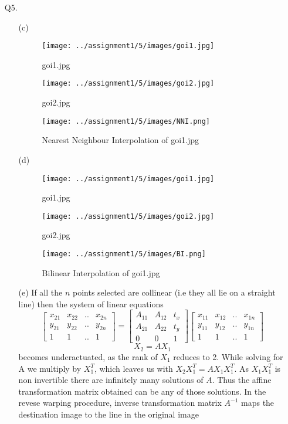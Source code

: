 \documentclass[11pt]{article}
\begin{document}
\maketitle

\begin{enumerate}
\item[Q5.]
\begin{enumerate}

\item[(c)] \
\begin{figure}[!htb]
      \texttt{[image: ../assignment1/5/images/goi1.jpg]}
      \caption*{goi1.jpg}
    \endminipage\hfill
      \texttt{[image: ../assignment1/5/images/goi2.jpg]}
      \caption*{goi2.jpg}
    \endminipage\hfill
      \texttt{[image: ../assignment1/5/images/NNI.png]}
      \caption*{Nearest Neighbour Interpolation of goi1.jpg}
    \endminipage
\end{figure}

\item[(d)] \
\begin{figure}[!htb]
      \texttt{[image: ../assignment1/5/images/goi1.jpg]}
      \caption*{goi1.jpg}
    \endminipage\hfill
      \texttt{[image: ../assignment1/5/images/goi2.jpg]}
      \caption*{goi2.jpg}
    \endminipage\hfill
      \texttt{[image: ../assignment1/5/images/BI.png]}
      \caption*{Bilinear Interpolation of goi1.jpg}
    \endminipage
\end{figure}

\item[(e)] If all the $n$ points selected are collinear (i.e they all lie on a straight line) then the system of linear equations
$$
\begin{bmatrix}
    x_{21} & x_{22} &.. & x_{2n} \\
    y_{21} & y_{22} &.. & y_{2n} \\
    1 & 1 &.. & 1
\end{bmatrix} = 
\begin{bmatrix}
    A_{11} & A_{12} & t_{x} \\
    A_{21} & A_{22} & t_{y} \\
    0 & 0 & 1
\end{bmatrix}
\begin{bmatrix}
    x_{11} & x_{12} &.. & x_{1n} \\
    y_{11} & y_{12} &.. & y_{1n} \\
    1 & 1 &.. & 1
\end{bmatrix}
$$
$$
X_{2} = AX_{1}
$$
becomes underactuated, as the rank of $X_{1}$ reduces to 2. While solving for A we multiply by $X_{1}^{T}$, which leaves us with $X_{2}X_{1}^{T}=AX_{1}X_{1}^{T}$. As $X_{1}X_{1}^{T}$ is non invertible there are infinitely many solutions of $A$. Thus the affine transformation matrix obtained can be any of those solutions.
In the revese warping procedure, inverse transformation matrix $A^{-1}$ maps the destination image to the line in the original image

\end{enumerate}
\end{enumerate}
\end{document}
